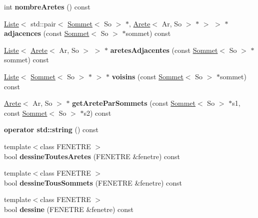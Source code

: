 \begin{DoxyCompactItemize}
int {\bfseries nombre\+Aretes} () const
\item 
\mbox{\label{class_graphe_a0fc44194531e5ad8bf78a750ebb19a6e}} 
\mbox{\hyperlink{class_liste}{Liste}}$<$ std\+::pair$<$ \mbox{\hyperlink{class_sommet}{Sommet}}$<$ So $>$ $\ast$, \mbox{\hyperlink{class_arete}{Arete}}$<$ Ar, So $>$ $\ast$ $>$ $>$ $\ast$ {\bfseries adjacences} (const \mbox{\hyperlink{class_sommet}{Sommet}}$<$ So $>$ $\ast$sommet) const
\item 
\mbox{\label{class_graphe_a970873ed9002056f58e86c47cc02a080}} 
\mbox{\hyperlink{class_liste}{Liste}}$<$ \mbox{\hyperlink{class_arete}{Arete}}$<$ Ar, So $>$ $>$ $\ast$ {\bfseries aretes\+Adjacentes} (const \mbox{\hyperlink{class_sommet}{Sommet}}$<$ So $>$ $\ast$sommet) const
\item 
\mbox{\label{class_graphe_a8ad810db6581b195c7d5b4bf25a86d95}} 
\mbox{\hyperlink{class_liste}{Liste}}$<$ \mbox{\hyperlink{class_sommet}{Sommet}}$<$ So $>$ $\ast$ $>$ $\ast$ {\bfseries voisins} (const \mbox{\hyperlink{class_sommet}{Sommet}}$<$ So $>$ $\ast$sommet) const
\item 
\mbox{\label{class_graphe_a7627cce988794442b1eca7709d77194a}} 
\mbox{\hyperlink{class_arete}{Arete}}$<$ Ar, So $>$ $\ast$ {\bfseries get\+Arete\+Par\+Sommets} (const \mbox{\hyperlink{class_sommet}{Sommet}}$<$ So $>$ $\ast$s1, const \mbox{\hyperlink{class_sommet}{Sommet}}$<$ So $>$ $\ast$s2) const
\item 
\mbox{\label{class_graphe_a25310143fb14a646cef18ad756618312}} 
{\bfseries operator std\+::string} () const
\item 
\mbox{\label{class_graphe_a518e2e51223c5afe6e875ee682fe5d6b}} 
{\footnotesize template$<$class F\+E\+N\+E\+T\+RE $>$ }\\bool {\bfseries dessine\+Toutes\+Aretes} (F\+E\+N\+E\+T\+RE \&fenetre) const
\item 
\mbox{\label{class_graphe_a3bddb6d11f19ae9152a7489c239e8f99}} 
{\footnotesize template$<$class F\+E\+N\+E\+T\+RE $>$ }\\bool {\bfseries dessine\+Tous\+Sommets} (F\+E\+N\+E\+T\+RE \&fenetre) const
\item 
\mbox{\label{class_graphe_a265ca249fcf400c43b5dfb3a1e7886c3}} 
{\footnotesize template$<$class F\+E\+N\+E\+T\+RE $>$ }\\bool {\bfseries dessine} (F\+E\+N\+E\+T\+RE \&fenetre) const
\end{DoxyCompactItemize}
